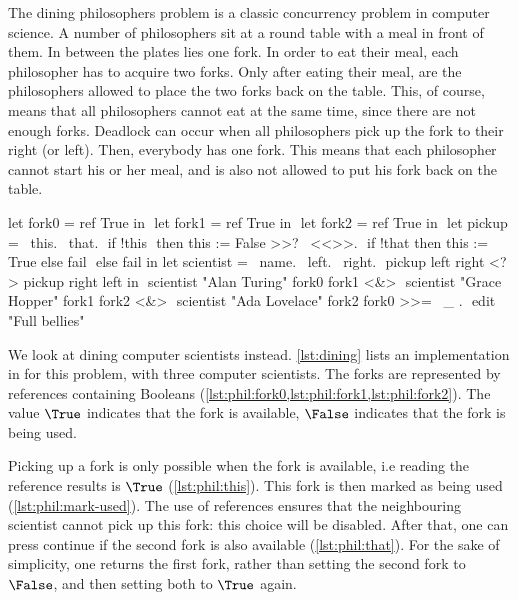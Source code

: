 The dining philosophers problem is a classic concurrency problem in computer science.
A number of philosophers sit at a round table with a meal in front of them.
In between the plates lies one fork.
In order to eat their meal, each philosopher has to acquire two forks.
Only after eating their meal, are the philosophers allowed to place the two forks back on the table.
This, of course, means that all philosophers cannot eat at the same time, since there are not enough forks.
Deadlock can occur when all philosophers pick up the fork to their right (or left).
Then, everybody has one fork.
This means that each philosopher cannot start his or her meal, and is also not allowed to put his fork back on the table.

\begin{TASK}[
    float=ht,
    numbers=right,
    caption={Dining philosophers problem with three computer scientists.},
    label=lst:dining]
  let fork0 = ref True in $\label{lst:phil:fork0}$
  let fork1 = ref True in $\label{lst:phil:fork1}$
  let fork2 = ref True in $\label{lst:phil:fork2}$
  let pickup = \ this. \ that. $\label{lst:phil:this}$
    if !this $\label{lst:phil:deref}$
      then this := False >>? \ <<>>. $\label{lst:phil:mark-used}$
        if !that then this := True else fail $\label{lst:phil:that}$
      else fail in
  let scientist = \ name. \ left. \ right. $\label{lst:phil:scientist}$
    pickup left right <?> pickup right left in $\label{lst:phil:pick}$
  scientist "Alan Turing" fork0 fork1 <&> $\label{lst:phil:scientist0}$
  scientist "Grace Hopper" fork1 fork2 <&> $\label{lst:phil:scientist1}$
  scientist "Ada Lovelace" fork2 fork0 >>= \ _ . $\label{lst:phil:scientist2}$
    edit "Full bellies"
\end{TASK}

We look at dining computer scientists instead.
\cref{lst:dining} lists an implementation in \TOPHAT for this problem, with three computer scientists.
The forks are represented by references containing Booleans (\cref{lst:phil:fork0,lst:phil:fork1,lst:phil:fork2}).
The value $\True$ indicates that the fork is available,
$\False$ indicates that the fork is being used.

Picking up a fork is only possible when the fork is available,
i.e reading the reference results is $\True$ (\cref{lst:phil:this}).
This fork is then marked as being used (\cref{lst:phil:mark-used}).
The use of references ensures that the neighbouring scientist cannot pick up this fork: this choice will be disabled.
After that, one can press continue if the second fork is also available (\cref{lst:phil:that}).
For the sake of simplicity, one returns the first fork, rather than setting the second fork to $\False$, and then setting both to $\True$ again.

